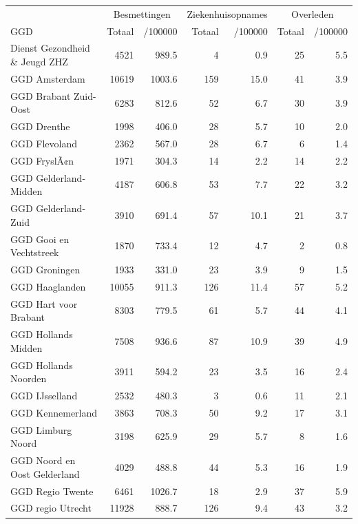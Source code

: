 \documentclass[
  english,
  man,floatsintext]{apa6}
\begin{document}
\begin{table}[H]
\centering\begingroup\fontsize{10}{12}\selectfont

\begin{threeparttable}
\begin{tabular}{lrrrrrr}
\toprule
\multicolumn{1}{c}{ } & \multicolumn{2}{c}{Besmettingen} & \multicolumn{2}{c}{Ziekenhuisopnames} & \multicolumn{2}{c}{Overleden} \\
\cmidrule(l{3pt}r{3pt}){2-3} \cmidrule(l{3pt}r{3pt}){4-5} \cmidrule(l{3pt}r{3pt}){6-7}
GGD & Totaal & /100000 & Totaal & /100000 & Totaal & /100000\\
\midrule
Dienst Gezondheid \& Jeugd ZHZ & 4521 & 989.5 & 4 & 0.9 & 25 & 5.5\\
GGD Amsterdam & 10619 & 1003.6 & 159 & 15.0 & 41 & 3.9\\
GGD Brabant Zuid-Oost & 6283 & 812.6 & 52 & 6.7 & 30 & 3.9\\
GGD Drenthe & 1998 & 406.0 & 28 & 5.7 & 10 & 2.0\\
GGD Flevoland & 2362 & 567.0 & 28 & 6.7 & 6 & 1.4\\
GGD FryslÃ¢n & 1971 & 304.3 & 14 & 2.2 & 14 & 2.2\\
GGD Gelderland-Midden & 4187 & 606.8 & 53 & 7.7 & 22 & 3.2\\
GGD Gelderland-Zuid & 3910 & 691.4 & 57 & 10.1 & 21 & 3.7\\
GGD Gooi en Vechtstreek & 1870 & 733.4 & 12 & 4.7 & 2 & 0.8\\
GGD Groningen & 1933 & 331.0 & 23 & 3.9 & 9 & 1.5\\
GGD Haaglanden & 10055 & 911.3 & 126 & 11.4 & 57 & 5.2\\
GGD Hart voor Brabant & 8303 & 779.5 & 61 & 5.7 & 44 & 4.1\\
GGD Hollands Midden & 7508 & 936.6 & 87 & 10.9 & 39 & 4.9\\
GGD Hollands Noorden & 3911 & 594.2 & 23 & 3.5 & 16 & 2.4\\
GGD IJsselland & 2532 & 480.3 & 3 & 0.6 & 11 & 2.1\\
GGD Kennemerland & 3863 & 708.3 & 50 & 9.2 & 17 & 3.1\\
GGD Limburg Noord & 3198 & 625.9 & 29 & 5.7 & 8 & 1.6\\
GGD Noord en Oost Gelderland & 4029 & 488.8 & 44 & 5.3 & 16 & 1.9\\
GGD Regio Twente & 6461 & 1026.7 & 18 & 2.9 & 37 & 5.9\\
GGD regio Utrecht & 11928 & 888.7 & 126 & 9.4 & 43 & 3.2\\

\end{tabular}
\end{threeparttable}
\end{table}
\end{document}
